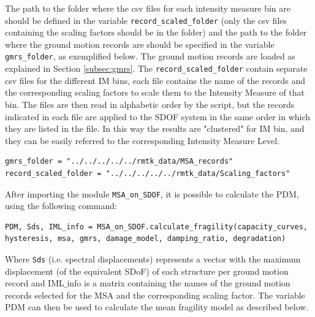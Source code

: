 {The path to the folder where the csv files for each intensity measure bin are should be defined in the variable \verb=record_scaled_folder= (only the csv files containing the scaling factors should be in the folder) and the path to the folder where the ground motion records are should be specified in the variable \verb=gmrs_folder=, as exemplified below. The ground motion records are loaded as explained in Section \ref{subsec:gmrs}. The \verb=record_scaled_folder= contain separate csv files for the different IM bins, each file contains the name of the records and the corresponding scaling factors to scale them to the Intensity Measure of that bin. The files are then read in alphabetic order by the script, but the records indicated in each file are applied to the SDOF system in the same order in which they are listed in the file. In this way the results are "clustered" for IM bin, and they can be easily referred to the corresponding Intensity Measure Level.

\begin{Verbatim}[frame=single, commandchars=\\\{\}, samepage=true]
gmrs_folder = "../../../../../rmtk_data/MSA_records"
record_scaled_folder = "../../../../../rmtk_data/Scaling_factors"
\end{Verbatim}

After importing the module \verb=MSA_on_SDOF=, it is possible to calculate the PDM, using the following command:

\begin{Verbatim}[frame=single, commandchars=\\\{\}, samepage=true]
PDM, Sds, IML_info = MSA_on_SDOF.calculate_fragility(capacity_curves,
hysteresis, msa, gmrs, damage_model, damping_ratio, degradation)
\end{Verbatim}

Where \verb=Sds= (i.e. spectral displacements) represents a vector with the maximum displacement (of the equivalent SDoF) of each structure per ground motion record and IML$\_$info is a matrix containing the names of the ground motion records selected for the MSA and the corresponding scaling factor. The variable PDM can then be used to calculate the mean fragility model as described below.\\

}
